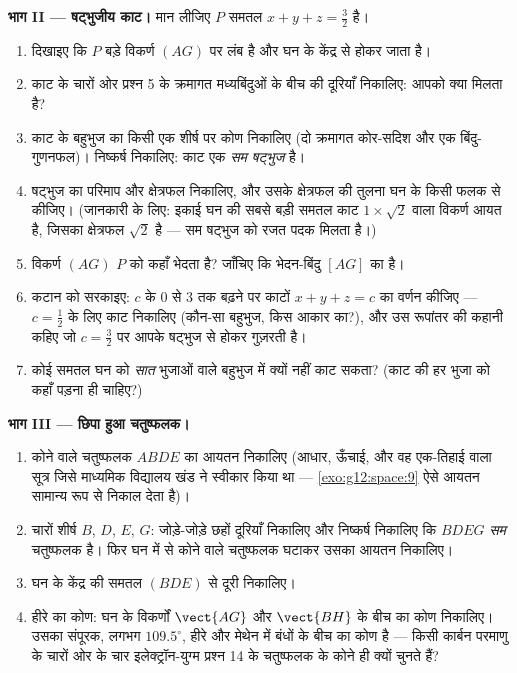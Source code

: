 \begin{problem}
\medskip
\noindent\textbf{भाग II --- षट्भुजीय काट।}
मान लीजिए $P$ समतल $x + y + z = \frac32$ है।
\begin{enumerate}[resume]
  \item दिखाइए कि $P$ बड़े विकर्ण $(AG)$ पर लंब है और घन के केंद्र से होकर
        जाता है।
  \item काट के चारों ओर प्रश्न 5 के क्रमागत मध्यबिंदुओं के बीच की दूरियाँ
        निकालिए: आपको क्या मिलता है?
  \item काट के बहुभुज का किसी एक शीर्ष पर कोण निकालिए (दो क्रमागत कोर-सदिश
        और एक बिंदु-गुणनफल)। निष्कर्ष निकालिए: काट एक \emph{सम षट्भुज} है।
  \item षट्भुज का परिमाप और क्षेत्रफल निकालिए, और उसके क्षेत्रफल की तुलना
        घन के किसी फलक से कीजिए। (जानकारी के लिए: इकाई घन की सबसे बड़ी समतल
        काट $1 \times \sqrt2$ वाला विकर्ण आयत है, जिसका क्षेत्रफल $\sqrt2$ है --- सम षट्भुज
        को रजत पदक मिलता है।)
  \item विकर्ण $(AG)$ $P$ को कहाँ भेदता है? जाँचिए कि भेदन-बिंदु $[AG]$ का
         है।
  \item कटान को सरकाइए: $c$ के $0$ से $3$ तक बढ़ने पर काटों $x + y + z = c$ का
        वर्णन कीजिए --- $c = \frac12$ के लिए काट निकालिए (कौन-सा बहुभुज, किस आकार
        का?), और उस रूपांतर की कहानी कहिए जो $c = \frac32$ पर आपके षट्भुज से होकर
        गुज़रती है।
  \item कोई समतल घन को \emph{सात} भुजाओं वाले बहुभुज में क्यों नहीं काट सकता?
        (काट की हर भुजा को कहाँ पड़ना ही चाहिए?)
\end{enumerate}

\medskip
\noindent\textbf{भाग III --- छिपा हुआ चतुष्फलक।}
\begin{enumerate}[resume]
  \item कोने वाले चतुष्फलक $ABDE$ का आयतन निकालिए (आधार, ऊँचाई, और वह
        एक-तिहाई वाला सूत्र जिसे माध्यमिक विद्यालय खंड ने स्वीकार किया था
        --- \cref{exo:g12:space:9} ऐसे आयतन सामान्य रूप से निकाल देता है)।
  \item चारों शीर्ष $B$, $D$, $E$, $G$: जोड़े-जोड़े छहों दूरियाँ
        निकालिए और निष्कर्ष निकालिए कि $BDEG$ \emph{सम} चतुष्फलक है। फिर घन
        में से कोने वाले चतुष्फलक घटाकर उसका आयतन निकालिए।
  \item घन के केंद्र की समतल $(BDE)$ से दूरी निकालिए।
  \item हीरे का कोण: घन के विकर्णों $\vect{AG}$ और $\vect{BH}$ के बीच का कोण निकालिए।
        उसका संपूरक, लगभग $109.5^\circ$, हीरे और मेथेन में बंधों के बीच का कोण है
        --- किसी कार्बन परमाणु के चारों ओर के चार इलेक्ट्रॉन-युग्म प्रश्न
        14 के चतुष्फलक के कोने ही क्यों चुनते हैं?
\end{enumerate}


\end{problem}
